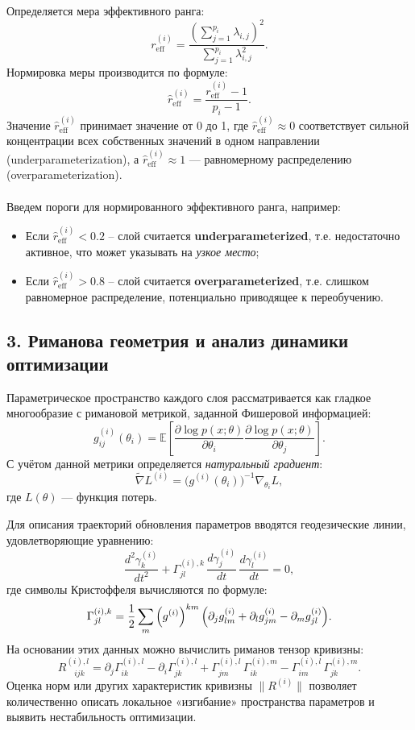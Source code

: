 \documentclass[a4paper,12pt]{article}
\begin{document}
Определяется мера эффективного ранга:
\[
r_{\text{eff}}^{(i)} = \frac{\left(\sum_{j=1}^{p_i} \lambda_{i,j}\right)^2}{\sum_{j=1}^{p_i}\lambda_{i,j}^2}.
\]
Нормировка меры производится по формуле:
\[
\hat{r}_{\text{eff}}^{(i)} = \frac{r_{\text{eff}}^{(i)} - 1}{p_i - 1}.
\]
Значение \(\hat{r}_{\text{eff}}^{(i)}\) принимает значение от 0 до 1, где \(\hat{r}_{\text{eff}}^{(i)} \approx 0\) соответствует сильной концентрации всех собственных значений в одном направлении (underparameterization), а \(\hat{r}_{\text{eff}}^{(i)} \approx 1\) --- равномерному распределению (overparameterization).\\\\
Введем пороги для нормированного эффективного ранга, например:
\begin{itemize}[leftmargin=0.5cm]
    \item Если \(\hat{r}_{\text{eff}}^{(i)} < 0.2\) – слой считается \textbf{underparameterized}, т.е. недостаточно активное, что может указывать на \textit{узкое место};
    \item Если \(\hat{r}_{\text{eff}}^{(i)} > 0.8\) – слой считается \textbf{overparameterized}, т.е. слишком равномерное распределение, потенциально приводящее к переобучению.
\end{itemize}

\subsection*{3. Риманова геометрия и анализ динамики оптимизации}

Параметрическое пространство каждого слоя рассматривается как гладкое многообразие с римановой метрикой, заданной Фишеровой информацией:
\[
g^{(i)}_{ij}(\theta_i) = \mathbb{E}\left[\frac{\partial \log p(x;\theta)}{\partial \theta_{i}} \frac{\partial \log p(x;\theta)}{\partial \theta_{j}}\right].
\]
С учётом данной метрики определяется \emph{натуральный градиент}:
\[
\tilde{\nabla} L^{(i)} = \bigl(g^{(i)}(\theta_i)\bigr)^{-1}\nabla_{\theta_i} L,
\]
где \( L(\theta) \) --- функция потерь.

Для описания траекторий обновления параметров вводятся геодезические линии, удовлетворяющие уравнению:
\[
\frac{d^2\gamma^{(i)}_k}{dt^2} + \Gamma^{(i),k}_{jl}\,\frac{d\gamma^{(i)}_j}{dt}\,\frac{d\gamma^{(i)}_l}{dt} = 0,
\]
где символы Кристоффеля вычисляются по формуле:
\[
\Gamma^{(i),k}_{jl} = \frac{1}{2}\sum_{m}\left(g^{(i)}\right)^{km}\Bigl(\partial_j g^{(i)}_{lm} + \partial_l g^{(i)}_{jm} - \partial_m g^{(i)}_{jl}\Bigr).
\]
На основании этих данных можно вычислить риманов тензор кривизны:
\[
R^{(i),l}_{\quad ijk} = \partial_j \Gamma^{(i),l}_{ik} - \partial_i \Gamma^{(i),l}_{jk} + \Gamma^{(i),l}_{jm}\,\Gamma^{(i),m}_{ik} - \Gamma^{(i),l}_{im}\,\Gamma^{(i),m}_{jk}.
\]
Оценка норм или других характеристик кривизны \(\|R^{(i)}\|\) позволяет количественно описать локальное «изгибание» пространства параметров и выявить нестабильность оптимизации.
\end{document}
